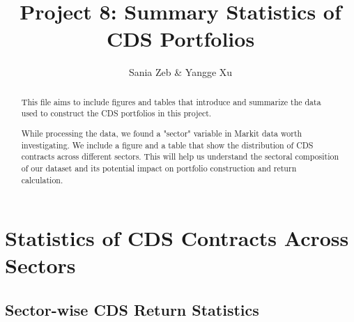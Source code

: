 \documentclass{article}
\title{Project 8: Summary Statistics of CDS Portfolios}
\author{Sania Zeb \& Yangge Xu}
\begin{document}
\maketitle

\begin{abstract}
This file aims to include figures and tables that introduce and summarize the 
data used to construct the CDS portfolios in this project.

While processing the data, we found a "sector" variable in Markit data worth investigating.
We include a figure and a table that show the distribution of CDS contracts across different sectors. 
This will help us understand the sectoral composition of our dataset and its potential impact on portfolio construction and return calculation.
\end{abstract}

\section{Statistics of CDS Contracts Across Sectors}

\subsection{Sector-wise CDS Return Statistics}
\end{document}
